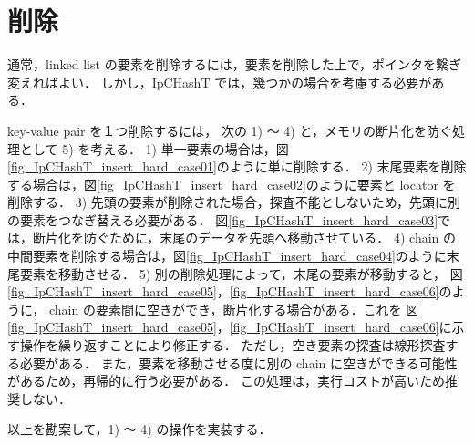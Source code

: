 
\section{削除}

通常，linked list の要素を削除するには，要素を削除した上で，ポインタを繋ぎ変えればよい．
しかし，IpCHashT では，幾つかの場合を考慮する必要がある．

key-value pair を１つ削除するには，
次の 1) 〜 4) と，メモリの断片化を防ぐ処理として 5) を考える．
1) 単一要素の場合は，図\ref{fig_IpCHashT_insert_hard_case01}のように単に削除する．
2) 末尾要素を削除する場合は，図\ref{fig_IpCHashT_insert_hard_case02}のように要素と locator を削除する．
3) 先頭の要素が削除された場合，探査不能としないため，先頭に別の要素をつなぎ替える必要がある．
図\ref{fig_IpCHashT_insert_hard_case03}では，断片化を防ぐために，末尾のデータを先頭へ移動させている．
4) chain の中間要素を削除する場合は，図\ref{fig_IpCHashT_insert_hard_case04}のように末尾要素を移動させる．
5) 別の削除処理によって，末尾の要素が移動すると，
図\ref{fig_IpCHashT_insert_hard_case05}，\ref{fig_IpCHashT_insert_hard_case06}のように，
chain の要素間に空きができ，断片化する場合がある．これを
図\ref{fig_IpCHashT_insert_hard_case05}，\ref{fig_IpCHashT_insert_hard_case06}に示す操作を繰り返すことにより修正する．
ただし，空き要素の探査は線形探査する必要がある．
また，要素を移動させる度に別の chain に空きができる可能性があるため，再帰的に行う必要がある．
この処理は，実行コストが高いため推奨しない．

以上を勘案して，1) 〜 4) の操作を実装する．

